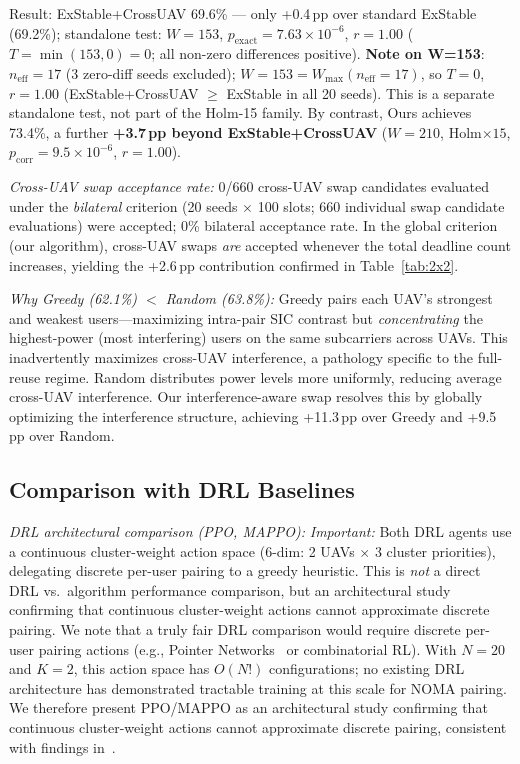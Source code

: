 \documentclass[journal]{IEEEtran}
\begin{document}
Result: ExStable+CrossUAV 69.6\% --- only +0.4\,pp over standard ExStable (69.2\%); standalone test: $W\!=\!153$, $p_{\text{exact}}\!=\!7.63\!\times\!10^{-6}$, $r\!=\!1.00$ ($T\!=\!\min(153,0)\!=\!0$; all non-zero differences positive).
\textbf{Note on W=153}: $n_{\text{eff}}\!=\!17$ (3 zero-diff seeds excluded); $W\!=\!153\!=\!W_{\max}(n_{\text{eff}}\!=\!17)$, so $T\!=\!0$, $r\!=\!1.00$ (ExStable+CrossUAV $\geq$ ExStable in all 20 seeds). This is a separate standalone test, not part of the Holm-15 family.
By contrast, Ours achieves 73.4\%, a further \textbf{+3.7\,pp beyond ExStable+CrossUAV} ($W\!=\!210$, Holm$\times 15$, $p_{\text{corr}}\!=\!9.5\!\times\!10^{-6}$, $r\!=\!1.00$).

\emph{Cross-UAV swap acceptance rate:} 0/660 cross-UAV swap candidates evaluated under the \emph{bilateral} criterion (20 seeds $\times$ 100 slots; 660 individual swap candidate evaluations) were accepted; 0\% bilateral acceptance rate.
In the global criterion (our algorithm), cross-UAV swaps \emph{are} accepted whenever the total deadline count increases, yielding the +2.6\,pp contribution confirmed in Table~\ref{tab:2x2}.

\emph{Why Greedy (62.1\%) $<$ Random (63.8\%):}
Greedy pairs each UAV's strongest and weakest users---maximizing intra-pair SIC contrast but \emph{concentrating} the highest-power (most interfering) users on the same subcarriers across UAVs.
This inadvertently maximizes cross-UAV interference, a pathology specific to the full-reuse regime.
Random distributes power levels more uniformly, reducing average cross-UAV interference.
Our interference-aware swap resolves this by globally optimizing the interference structure, achieving +11.3\,pp over Greedy and +9.5\,pp over Random.

\subsection{Comparison with DRL Baselines}
\label{sec:results_drl}

\emph{DRL architectural comparison (PPO, MAPPO):}
\emph{Important:} Both DRL agents use a continuous cluster-weight action space (6-dim: 2 UAVs $\times$ 3 cluster priorities), delegating discrete per-user pairing to a greedy heuristic.
This is \emph{not} a direct DRL vs.\ algorithm performance comparison, but an architectural study confirming that continuous cluster-weight actions cannot approximate discrete pairing.
We note that a truly fair DRL comparison would require discrete per-user pairing actions (e.g., Pointer Networks~\cite{kool2019attention} or combinatorial RL). With $N\!=\!20$ and $K\!=\!2$, this action space has $O(N!)$ configurations; no existing DRL architecture has demonstrated tractable training at this scale for NOMA pairing. We therefore present PPO/MAPPO as an architectural study confirming that continuous cluster-weight actions cannot approximate discrete pairing, consistent with findings in~\cite{kool2019attention}.
\end{document}
